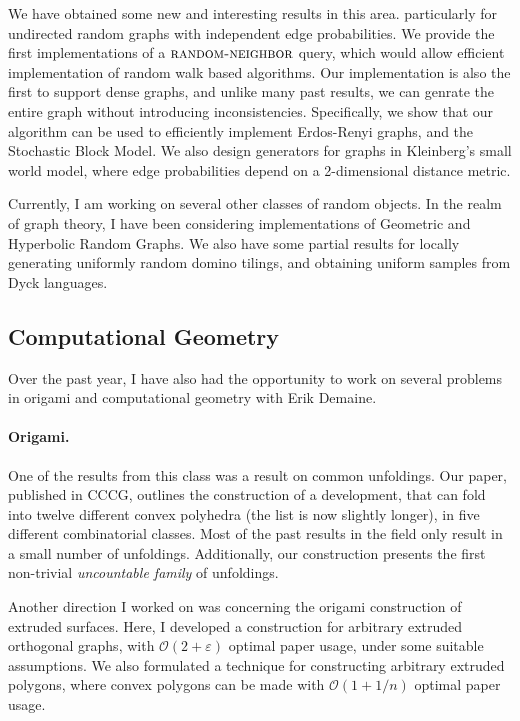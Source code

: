 We have obtained some new and interesting results in this area.
particularly for undirected random graphs with independent edge probabilities.
We provide the first implementations of a $\textsc{random-neighbor}$ query,
which would allow efficient implementation of random walk based algorithms.
Our implementation is also the first to support dense graphs,
and unlike many past results, we can genrate the entire graph without introducing inconsistencies.
Specifically, we show that our algorithm can be used to efficiently implement Erdos-Renyi graphs, and the Stochastic Block Model.
We also design generators for graphs in Kleinberg's small world model,
where edge probabilities depend on a 2-dimensional distance metric.

Currently, I am working on several other classes of random objects.
In the realm of graph theory, I have been considering implementations of Geometric and Hyperbolic Random Graphs.
We also have some partial results for locally generating uniformly random domino tilings,
and obtaining uniform samples from Dyck languages.

\subsection*{Computational Geometry}

Over the past year, I have also had the opportunity to work on several problems 
in origami and computational geometry with Erik Demaine.

\paragraph{Origami.}
One of the results from this class was a result on common unfoldings.
Our paper\cite{common}, published in CCCG, outlines the construction of a development,
that can fold into twelve different convex polyhedra (the list is now slightly longer),
in five different combinatorial classes.
Most of the past results in the field \cite{box2, box2.5, box3, cube_tet, jz}
only result in a small number of unfoldings.
Additionally, our construction presents the first non-trivial \emph{uncountable family} of unfoldings.

Another direction I worked on was concerning the origami construction of extruded surfaces.
Here, I developed a construction for arbitrary extruded orthogonal graphs,
with $ \mathcal{O}(2+\varepsilon) $ optimal paper usage, under some suitable assumptions.
We also formulated a technique for constructing arbitrary extruded polygons,
where convex polygons can be made with $ \mathcal{O}(1+1/n) $ optimal paper usage.

